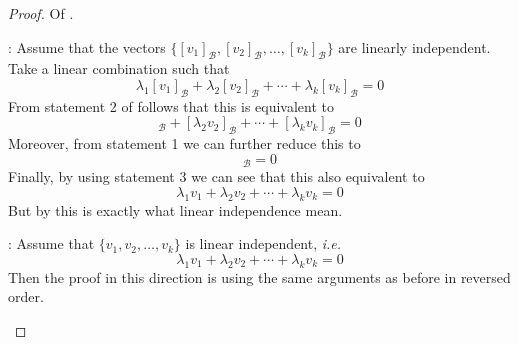 \begin{proof}
	Of .
	\begin{flushleft}
		\proofright: Assume that the vectors
		$\{[v_1]_\mathcal{B},[v_2]_\mathcal{B},\dots,[v_k]_\mathcal{B}\}$ are
		linearly independent. Take a linear combination such that
		\begin{equation*}
			\lambda_1[v_1]_\mathcal{B}+\lambda_2[v_2]_\mathcal{B}+\cdots+\lambda_k[v_k]_\mathcal{B}=0
		\end{equation*}
		From statement 2 of  follows that
		this is equivalent to
		\begin{equation*}
			[\lambda_1v_1]_\mathcal{B}+[\lambda_2v_2]_\mathcal{B}+\cdots+[\lambda_kv_k]_\mathcal{B}=0
		\end{equation*}
		Moreover, from statement 1 we can further reduce this to
		\begin{equation*}
			[\lambda_1v_1+\lambda_2v_2+\cdots+\lambda_kv_k]_\mathcal{B}=0
		\end{equation*}
		Finally, by using statement 3 we can see that this also equivalent to
		\begin{equation*}
			\lambda_1v_1+\lambda_2v_2+\cdots+\lambda_kv_k = 0
		\end{equation*}
		But by  this is exactly what
		linear independence mean.
	\end{flushleft}
	\begin{flushleft}
		\proofleft: Assume that $\{v_1,v_2,\dots,v_k\}$ is linear independent,
		\textit{i.e.}
		\begin{equation*}
			\lambda_1v_1+\lambda_2v_2+\cdots+\lambda_kv_k = 0
		\end{equation*}
		Then the proof in this direction is using the same arguments as before in
		reversed order.
	\end{flushleft}
\end{proof}
